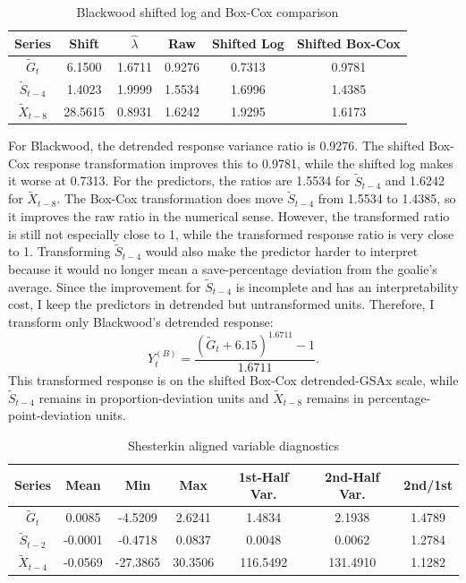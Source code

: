 \documentclass[
  10pt,
]{extarticle}
\begin{document}
\begin{center}
\scriptsize
\begin{table}[H]

\caption{\label{tab:p1-blackwood-transform-table}Blackwood shifted log and Box-Cox comparison}
\centering
\begin{tabular}[t]{cccccc}
\toprule
Series & Shift & $\hat{\lambda}$ & Raw & Shifted Log & Shifted Box-Cox\\
\midrule
$\tilde{G}_t$ & 6.1500 & 1.6711 & 0.9276 & 0.7313 & 0.9781\\
$\tilde{S}_{t-4}$ & 1.4023 & 1.9999 & 1.5534 & 1.6996 & 1.4385\\
$\tilde{X}_{t-8}$ & 28.5615 & 0.8931 & 1.6242 & 1.9295 & 1.6173\\
\bottomrule
\end{tabular}
\end{table}
\normalsize
\end{center}

For Blackwood, the detrended response variance ratio is 0.9276. The shifted Box-Cox response transformation improves this to 0.9781, while the shifted log makes it worse at 0.7313. For the predictors, the ratios are 1.5534 for \(\tilde{S}_{t-4}\) and 1.6242 for \(\tilde{X}_{t-8}\). The Box-Cox transformation does move \(\tilde{S}_{t-4}\) from 1.5534 to 1.4385, so it improves the raw ratio in the numerical sense. However, the transformed ratio is still not especially close to 1, while the transformed response ratio is very close to 1. Transforming \(\tilde{S}_{t-4}\) would also make the predictor harder to interpret because it would no longer mean a save-percentage deviation from the goalie's average. Since the improvement for \(\tilde{S}_{t-4}\) is incomplete and has an interpretability cost, I keep the predictors in detrended but untransformed units. Therefore, I transform only Blackwood's detrended response:
\[
Y^{(B)}_t
= \frac{\left(\tilde{G}_t + 6.15\right)^{1.6711} - 1}{1.6711}.
\]
This transformed response is on the shifted Box-Cox detrended-GSAx scale, while \(\tilde{S}_{t-4}\) remains in proportion-deviation units and \(\tilde{X}_{t-8}\) remains in percentage-point-deviation units.

\begin{center}
\scriptsize
\begin{table}[H]

\caption{\label{tab:p1-shesterkin-diag-table}Shesterkin aligned variable diagnostics}
\centering
\begin{tabular}[t]{ccccccc}
\toprule
Series & Mean & Min & Max & 1st-Half Var. & 2nd-Half Var. & 2nd/1st\\
\midrule
$\tilde{G}_t$ & 0.0085 & -4.5209 & 2.6241 & 1.4834 & 2.1938 & 1.4789\\
$\tilde{S}_{t-2}$ & -0.0001 & -0.4718 & 0.0837 & 0.0048 & 0.0062 & 1.2784\\
$\tilde{X}_{t-4}$ & -0.0569 & -27.3865 & 30.3506 & 116.5492 & 131.4910 & 1.1282\\
\bottomrule
\end{tabular}
\end{table}
\normalsize
\end{center}
\end{document}
